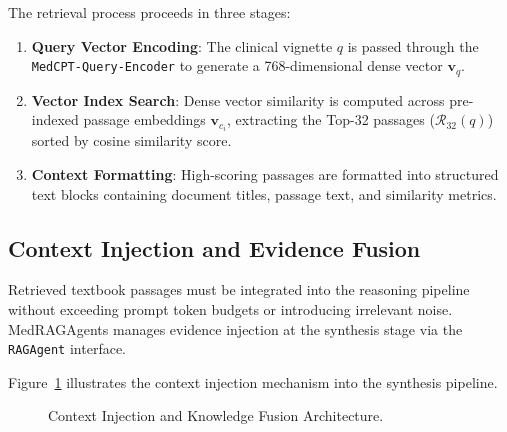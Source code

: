 The retrieval process proceeds in three stages:
\begin{enumerate}
    \item \textbf{Query Vector Encoding}: The clinical vignette $q$ is passed through the \texttt{MedCPT-Query-Encoder} to generate a 768-dimensional dense vector $\mathbf{v}_q$.
    \item \textbf{Vector Index Search}: Dense vector similarity is computed across pre-indexed passage embeddings $\mathbf{v}_{c_i}$, extracting the Top-32 passages ($\mathcal{R}_{32}(q)$) sorted by cosine similarity score.
    \item \textbf{Context Formatting}: High-scoring passages are formatted into structured text blocks containing document titles, passage text, and similarity metrics.
\end{enumerate}

\subsection{Context Injection and Evidence Fusion}

Retrieved textbook passages must be integrated into the reasoning pipeline without exceeding prompt token budgets or introducing irrelevant noise. MedRAGAgents manages evidence injection at the synthesis stage via the \texttt{RAGAgent} interface.

Figure~\ref{fig:context_injection} illustrates the context injection mechanism into the synthesis pipeline.

\begin{figure}[htbp]
\centering
{}
\caption{Context Injection and Knowledge Fusion Architecture.}
\label{fig:context_injection}
\end{figure}

